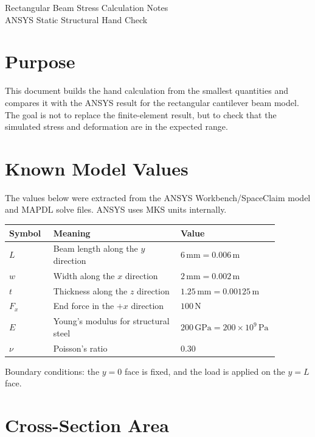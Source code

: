\documentclass[11pt]{article}
\newcommand{\unit}[1]{\,\mathrm{#1}}
\newcommand{\GPa}{\unit{GPa}}
\begin{document}
\begin{center}
{\LARGE Rectangular Beam Stress Calculation Notes}\\[4pt]
{\large ANSYS Static Structural Hand Check}\\[6pt]
\end{center}

\section{Purpose}

This document builds the hand calculation from the smallest quantities and compares it with the ANSYS result for the rectangular cantilever beam model. The goal is not to replace the finite-element result, but to check that the simulated stress and deformation are in the expected range.

\section{Known Model Values}

The values below were extracted from the ANSYS Workbench/SpaceClaim model and MAPDL solve files. ANSYS uses MKS units internally.

\begin{center}
\begin{tabular}{>{\centering\arraybackslash}p{0.16\linewidth} p{0.46\linewidth} p{0.26\linewidth}}
\toprule
Symbol & Meaning & Value \\
\midrule
$L$ & Beam length along the $y$ direction & $6\unit{mm}=0.006\unit{m}$ \\
$w$ & Width along the $x$ direction & $2\unit{mm}=0.002\unit{m}$ \\
$t$ & Thickness along the $z$ direction & $1.25\unit{mm}=0.00125\unit{m}$ \\
$F_x$ & End force in the $+x$ direction & $100\unit{N}$ \\
$E$ & Young's modulus for structural steel & $200\GPa=200\times10^9\unit{Pa}$ \\
$\nu$ & Poisson's ratio & $0.30$ \\
\bottomrule
\end{tabular}
\end{center}

Boundary conditions: the $y=0$ face is fixed, and the load is applied on the $y=L$ face.

\section{Cross-Section Area}
\end{document}
